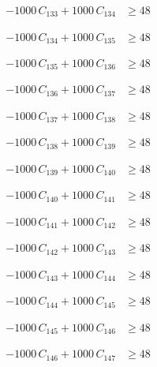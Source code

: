 \documentclass[a4paper,11pt]{article}
\begin{document}
\begin{align}
-1000\,C_{133} + 1000\,C_{134} &\geq 48 \nonumber
\end{align}

\begin{align}
-1000\,C_{134} + 1000\,C_{135} &\geq 48 \nonumber
\end{align}

\begin{align}
-1000\,C_{135} + 1000\,C_{136} &\geq 48 \nonumber
\end{align}

\begin{align}
-1000\,C_{136} + 1000\,C_{137} &\geq 48 \nonumber
\end{align}

\begin{align}
-1000\,C_{137} + 1000\,C_{138} &\geq 48 \nonumber
\end{align}

\begin{align}
-1000\,C_{138} + 1000\,C_{139} &\geq 48 \nonumber
\end{align}

\begin{align}
-1000\,C_{139} + 1000\,C_{140} &\geq 48 \nonumber
\end{align}

\begin{align}
-1000\,C_{140} + 1000\,C_{141} &\geq 48 \nonumber
\end{align}

\begin{align}
-1000\,C_{141} + 1000\,C_{142} &\geq 48 \nonumber
\end{align}

\begin{align}
-1000\,C_{142} + 1000\,C_{143} &\geq 48 \nonumber
\end{align}

\begin{align}
-1000\,C_{143} + 1000\,C_{144} &\geq 48 \nonumber
\end{align}

\begin{align}
-1000\,C_{144} + 1000\,C_{145} &\geq 48 \nonumber
\end{align}

\begin{align}
-1000\,C_{145} + 1000\,C_{146} &\geq 48 \nonumber
\end{align}

\begin{align}
-1000\,C_{146} + 1000\,C_{147} &\geq 48 \nonumber
\end{align}
\end{document}
